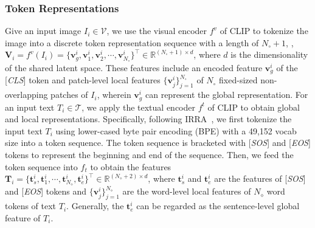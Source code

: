 \documentclass[10pt,twocolumn,letterpaper]{article}
\begin{document}
\subsubsection{Token Representations} Give an input image $I_i\in \mathcal{V}$, we use the visual encoder $f^v$ of CLIP to tokenize the image into a discrete token representation sequence with a length of $N_{\circ}+1$, \ie, $\boldsymbol{V}_{i}=f^v(I_i)=\{ \boldsymbol{v}^{i}_g,\boldsymbol{v}^{i}_1,\boldsymbol{v}^{i}_2,\cdots, \boldsymbol{v}^{i}_{N_\circ} \}^\top\in\mathbb{R}^{(N_{\circ}+1)\times d}$, where $d$ is the dimensionality of the shared latent space. These features include an encoded feature $\boldsymbol{v}^{i}_g$ of the [\emph{CLS}] token and patch-level local features $\{\boldsymbol{v}^{i}_j\}^{N_{\circ}}_{j=1}$ of $N_{\circ}$ fixed-sized non-overlapping patches of $I_i$, wherein $\boldsymbol{v}^{i}_g$ can represent the global representation. For an input text $T_i\in\mathcal{T}$, we apply the textual encoder $f^t$ of CLIP to obtain global and local representations. Specifically, following IRRA~\cite{jiang2023cross}, we first tokenize the input text $T_i$ using lower-cased byte pair encoding (BPE) with a 49,152 vocab size into a token sequence. The token sequence is bracketed with [\emph{SOS}] and [\emph{EOS}] tokens to represent the beginning and end of the sequence. Then, we feed the token sequence into $f_t$ to obtain the features $\boldsymbol{T}_i=\{ \boldsymbol{t}^{i}_s,\boldsymbol{t}^{i}_1,\cdots,\boldsymbol{t}^{i}_{N_\diamond},\boldsymbol{t}^{i}_e \}^\top\in\mathbb{R}^{(N_{\diamond}+2)\times d}$, where $\boldsymbol{t}^{i}_s$ and $\boldsymbol{t}^{i}_e$ are the features of [\emph{SOS}] and [\emph{EOS}] tokens and $\{\boldsymbol{v}_j^i\}^{N_\diamond}_{j=1}$ are the word-level local features of $N_\diamond$ word tokens of text $T_i$. Generally, the $\boldsymbol{t}^{i}_e$ can be regarded as the sentence-level global feature of $T_i$.
\end{document}
